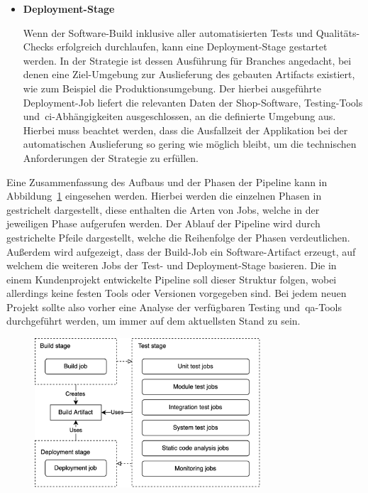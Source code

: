 \begin{itemize}
    \item {
        \textbf{Deployment-Stage}\par
        Wenn der Software-Build inklusive aller automatisierten Tests und Qualitäts-Checks erfolgreich durchlaufen,
        kann eine Deployment-Stage gestartet werden.
        In der Strategie ist dessen Ausführung für Branches angedacht, bei denen eine Ziel-Umgebung zur Auslieferung
        des gebauten Artifacts existiert, wie zum Beispiel die Produktionsumgebung.
        Der hierbei ausgeführte Deployment-Job liefert die relevanten Daten der Shop-Software, Testing-Tools
        und\ \acrshort{ci}-Abhängigkeiten ausgeschlossen, an die definierte Umgebung aus.
        Hierbei muss beachtet werden, dass die Ausfallzeit der Applikation bei der automatischen Auslieferung so gering
        wie möglich bleibt, um die technischen Anforderungen der Strategie zu erfüllen.
    }
\end{itemize}

Eine Zusammenfassung des Aufbaus und der Phasen der Pipeline kann in Abbildung\ \ref{fig:pipeline-visualization}
eingesehen werden.
Hierbei werden die einzelnen Phasen in gestrichelt dargestellt, diese enthalten die Arten von Jobs, welche
in der jeweiligen Phase aufgerufen werden.
Der Ablauf der Pipeline wird durch gestrichelte Pfeile dargestellt, welche die Reihenfolge der Phasen verdeutlichen.
Außerdem wird aufgezeigt, dass der Build-Job ein Software-Artifact erzeugt, auf welchem die weiteren Jobs der Test- und
Deployment-Stage basieren.
Die in einem Kundenprojekt entwickelte Pipeline soll dieser Struktur folgen, wobei allerdings keine festen Tools
oder Versionen vorgegeben sind.
Bei jedem neuen Projekt sollte also vorher eine Analyse der verfügbaren Testing und\ \acrshort{qa}-Tools durchgeführt
werden, um immer auf dem aktuellsten Stand zu sein.

\begin{figure}[H]
    \centering
    \includegraphics[width=0.75\textwidth]{images/content/pipeline-visualization}
    \label{fig:pipeline-visualization}
\end{figure}

